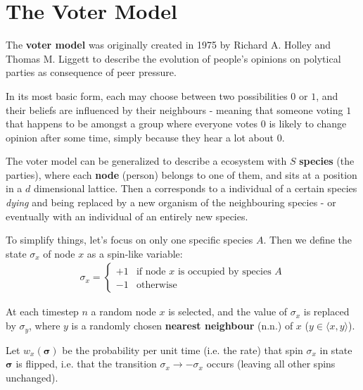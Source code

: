 \documentclass[../../main.tex]{subfiles}
\begin{document}
\section{The Voter Model}

The \textbf{voter model} was originally created in 1975 by Richard A. Holley and Thomas M. Liggett to describe the evolution of people's opinions on polytical parties as consequence of peer pressure.

\medskip

In its most basic form, each  may choose between two possibilities $0$ or $1$, and their beliefs are influenced by their neighbours - meaning that someone voting $1$ that happens to be amongst a group where everyone votes $0$ is likely to change opinion after some time, simply because they hear a lot about $0$.

\medskip

The voter model can be generalized to describe a ecosystem with $S$ \textbf{species} (the parties), where each \textbf{node} (person) belongs to one of them, and sits at a position in a $d$ dimensional lattice. Then a  corresponds to a individual of a certain species \textit{dying} and being replaced by a new organism of the neighbouring species - or eventually with an individual of an entirely new species.  

\medskip

To simplify things, let's focus on only one specific species $A$. Then we define the state $\sigma_x$ of node $x$ as a spin-like variable:
\begin{align*}
    \sigma_x = \begin{cases}
        +1 & \text{if node $x$ is occupied by species $A$}\\
        -1 & \text{otherwise}
    \end{cases}
\end{align*}

At each timestep $n$  a random node $x$ is selected, and the value of $\sigma_x$ is replaced by $\sigma_y$, where $y$ is a randomly chosen \textbf{nearest neighbour} (n.n.) of $x$ \hbox{($y \in \langle x,y \rangle$)}. 

\medskip

Let $w_x(\bm{\sigma})$ be the probability per unit time (i.e. the rate) that spin $\sigma_x$ in state $\bm{\sigma}$ is flipped, i.e. that the transition $\sigma_x \to -\sigma_x$ occurs (leaving all other spins unchanged). 
\end{document}
